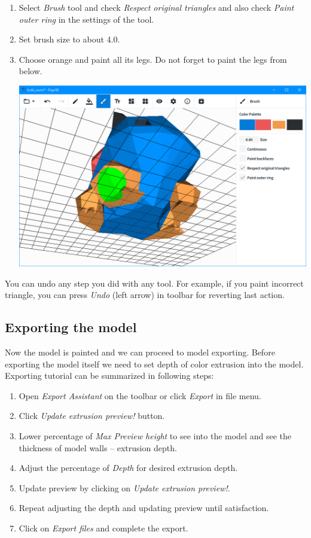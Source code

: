 \begin{enumerate}
\item Select \textit{Brush} tool and check \textit{Respect original triangles} and also check \textit{Paint outer ring} in the settings of the tool.
\item Set brush size to about 4.0.
\item Choose orange and paint all its legs. Do not forget to paint the legs from below.

\begin{center}
\includegraphics[scale=0.4]{images/bulb_legs.png}
\end{center}

\end{enumerate}


You can undo any step you did with any tool. For example, if you paint incorrect triangle, you can press \textit{Undo} (left arrow) in toolbar for reverting last action.

\subsection{Exporting the model}
Now the model is painted and we can proceed to model exporting. Before exporting the model itself we need to set depth of color extrusion into the model. Exporting tutorial can be summarized in following steps:


\begin{enumerate}
\item Open \textit{Export Assistant} on the toolbar or click \textit{Export} in file menu.
\item Click \textit{Update extrusion preview!} button.
\item Lower percentage of \textit{Max Preview height} to see into the model and see the thickness of model walls -- extrusion depth.
\item Adjust the percentage of \textit{Depth} for desired extrusion depth.
\item Update preview by clicking on \textit{Update extrusion preview!}.
\item Repeat adjusting the depth and updating preview until satisfaction.
\item Click on \textit{Export files} and complete the export.
\end{enumerate}

